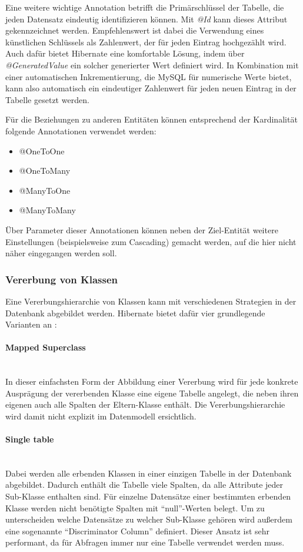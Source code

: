 Eine weitere wichtige Annotation betrifft die Primärschlüssel der Tabelle, die jeden Datensatz eindeutig identifizieren können. Mit \textit{@Id} kann dieses Attribut gekennzeichnet werden.
Empfehlenswert ist dabei die Verwendung eines künstlichen Schlüssels als Zahlenwert, der für jeden Eintrag hochgezählt wird.
Auch dafür bietet Hibernate eine komfortable Lösung, indem über \textit{@GeneratedValue} ein solcher generierter Wert definiert wird.
In Kombination mit einer automatischen Inkrementierung, die MySQL für numerische Werte bietet, kann also automatisch ein eindeutiger Zahlenwert für jeden neuen Eintrag in der Tabelle gesetzt werden.

Für die Beziehungen zu anderen Entitäten können entsprechend der Kardinalität folgende Annotationen verwendet werden:
\begin{itemize}
\item{@OneToOne}
\item{@OneToMany}
\item{@ManyToOne}
\item{@ManyToMany}
\end{itemize}

Über Parameter dieser Annotationen können neben der Ziel-Entität weitere Einstellungen (beispielsweise zum Cascading) gemacht werden, auf die hier nicht näher eingegangen werden soll.

\subsubsection{Vererbung von Klassen}
Eine Vererbungshierarchie von Klassen kann mit verschiedenen Strategien in der Datenbank abgebildet werden.
Hibernate bietet dafür vier grundlegende Varianten an \cite{Mihalcea2017}:
\paragraph{Mapped Superclass}$\;$ \\
In dieser einfachsten Form der Abbildung einer Vererbung wird für jede konkrete Ausprägung der vererbenden Klasse eine eigene Tabelle angelegt, die neben ihren eigenen auch alle Spalten der Eltern-Klasse enthält.
Die Vererbungshierarchie wird damit nicht explizit im Datenmodell ersichtlich.
\paragraph{Single table}$\;$ \\
Dabei werden alle erbenden Klassen in einer einzigen Tabelle in der Datenbank abgebildet. Dadurch enthält die Tabelle viele Spalten, da alle Attribute jeder Sub-Klasse enthalten sind.
Für einzelne Datensätze einer bestimmten erbenden Klasse werden nicht benötigte Spalten mit \enquote{null}-Werten belegt.
Um zu unterscheiden welche Datensätze zu welcher Sub-Klasse gehören wird außerdem eine sogenannte \enquote{Discriminator Column} definiert.
Dieser Ansatz ist sehr performant, da für Abfragen immer nur eine Tabelle verwendet werden muss.
